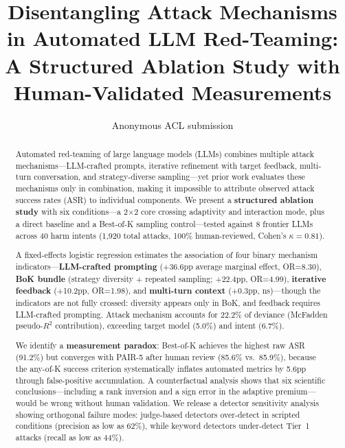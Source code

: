 \documentclass[11pt]{article}
\title{Disentangling Attack Mechanisms in Automated LLM Red-Teaming:\\A Structured Ablation Study with Human-Validated Measurements}
\author{Anonymous ACL submission}
\begin{document}
\maketitle

\begin{abstract}
Automated red-teaming of large language models (LLMs) combines multiple attack mechanisms---LLM-crafted prompts, iterative refinement with target feedback, multi-turn conversation, and strategy-diverse sampling---yet prior work evaluates these mechanisms only in combination, making it impossible to attribute observed attack success rates (ASR) to individual components. We present a \textbf{structured ablation study} with six conditions---a 2$\times$2 core crossing adaptivity and interaction mode, plus a direct baseline and a Best-of-K sampling control---tested against 8 frontier LLMs across 40 harm intents (1,920 total attacks, 100\% human-reviewed, Cohen's $\kappa=0.81$).

A fixed-effects logistic regression estimates the association of four binary mechanism indicators---\textbf{LLM-crafted prompting} (+36.6pp average marginal effect, OR=8.30), \textbf{BoK bundle} (strategy diversity + repeated sampling; +22.4pp, OR=4.99), \textbf{iterative feedback} (+10.2pp, OR=1.98), and \textbf{multi-turn context} (+0.3pp, ns)---though the indicators are not fully crossed: diversity appears only in BoK, and feedback requires LLM-crafted prompting. Attack mechanism accounts for 22.2\% of deviance (McFadden pseudo-$R^2$ contribution), exceeding target model (5.0\%) and intent (6.7\%).

We identify a \textbf{measurement paradox}: Best-of-K achieves the highest raw ASR (91.2\%) but converges with PAIR-5 after human review (85.6\% vs.\ 85.9\%), because the any-of-K success criterion systematically inflates automated metrics by 5.6pp through false-positive accumulation. A counterfactual analysis shows that six scientific conclusions---including a rank inversion and a sign error in the adaptive premium---would be wrong without human validation. We release a detector sensitivity analysis showing orthogonal failure modes: judge-based detectors over-detect in scripted conditions (precision as low as 62\%), while keyword detectors under-detect Tier~1 attacks (recall as low as 44\%).
\end{abstract}

\end{document}
